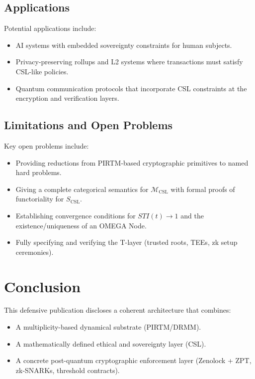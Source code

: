 \documentclass[11pt]{article}
\begin{document}
\subsection{Applications}

Potential applications include:

\begin{itemize}[leftmargin=*]
  \item AI systems with embedded sovereignty constraints for human subjects.
  \item Privacy-preserving rollups and L2 systems where transactions must satisfy CSL-like policies.
  \item Quantum communication protocols that incorporate CSL constraints at the encryption and verification layers.
\end{itemize}

\subsection{Limitations and Open Problems}

Key open problems include:

\begin{itemize}[leftmargin=*]
  \item Providing reductions from PIRTM-based cryptographic primitives to named hard problems.
  \item Giving a complete categorical semantics for $\mathcal{M}_{\mathrm{CSL}}$ with formal proofs of functoriality for $S_{\mathrm{CSL}}$.
  \item Establishing convergence conditions for $STI(t) \to 1$ and the existence/uniqueness of an OMEGA Node.
  \item Fully specifying and verifying the T-layer (trusted roots, TEEs, zk setup ceremonies).
\end{itemize}

\section{Conclusion}

This defensive publication discloses a coherent architecture that combines:

\begin{itemize}[leftmargin=*]
  \item A multiplicity-based dynamical substrate (PIRTM/DRMM).
  \item A mathematically defined ethical and sovereignty layer (CSL).
  \item A concrete post-quantum cryptographic enforcement layer (Zenolock + ZPT, zk-SNARKs, threshold contracts).
\end{itemize}
\end{document}
